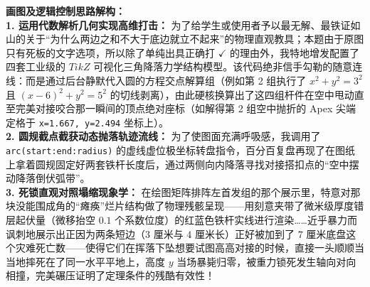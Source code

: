 \documentclass[12pt, a4paper]{ctexrep}
\begin{document}
\begin{center}
\end{center}

\vspace{0.6cm}

{\small\color{blue!70!black}
\textbf{画图及逻辑控制思路解构：}\\
\textbf{1. 运用代数解析几何实现高维打击：} 为了给学生或使用者予以最无解、最铁证如山的关于“为什么两边之和不大于底边就立不起来”的物理直观教具；本题由于原图只有死板的文字选项，所以除了单纯出具正确打 $\checkmark$ 的理由外，我特地增发配置了四套工业级的 $TikZ$ 可视化三角降落力学结构模型。该代码绝非信手勾勒的随意连线：而是通过后台静默代入圆的方程交点解算组（例如第 2 组执行了 $x^2+y^2=3^2$ 且 $(x-6)^2+y^2=5^2$ 的切线剥离），由此硬核换算出了这四组杆件在空中甩动直至完美对接咬合那一瞬间的顶点绝对座标（如解得第 2 组空中抛折的 Apex 尖端定格于 \texttt{x=1.667, y=2.494} 坐标上）。\\
\textbf{2. 圆规截点截获动态抛落轨迹流线：} 为了使图面充满呼吸感，我调用了 \texttt{arc(start:end:radius)} 的虚线虚位极坐标转盘指令，百分百复盘再现了在图纸上拿着圆规固定好两套铁杆长度后，通过两侧向内降落寻找对接搭扣点的“空中摆动降落倒伏弧带”。\\
\textbf{3. 死锁直观对照塌缩现象学：} 在绘图矩阵排阵左首发组的那个展示里，特意对那块没能围成角的“瘫痪”烂片结构做了物理残骸呈现——用刻意夹带了微米级厚度错层起伏量（微移抬空 $0.1$ 个系数位度）的红蓝色铁杆实线进行渲染……近乎暴力而讽刺地展示出正因为两条短边（$3$ 厘米与 $4$ 厘米长）正好被加到了 $7$ 厘米底盘这个灾难死亡数——使得它们在挥落下坠想要试图高高对接的时候，直接一头顺顺当当地摔死在了同一水平平地上，高度 $y$ 当场暴毙归零，被重力锁死发生轴向对向相撞，完美碾压证明了定理条件的残酷有效性！
}
\end{document}
